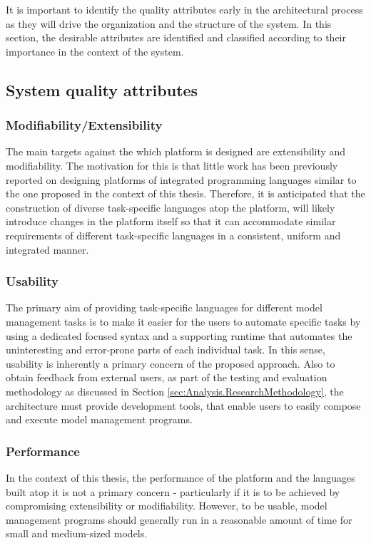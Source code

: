 It is important to identify the quality attributes early in the architectural process as they will drive the organization and the structure of the system. In this section, the desirable attributes are identified and classified according to their importance in the context of the system.

\subsection{System quality attributes}

\subsubsection{Modifiability/Extensibility}
The main targets against the which platform is designed are extensibility and modifiability. The motivation for this is that little work has been previously reported on designing platforms of integrated programming languages similar to the one proposed in the context of this thesis. Therefore, it is anticipated that the construction of diverse task-specific languages atop the platform, will likely introduce changes in the platform itself so that it can accommodate similar requirements of different task-specific languages in a consistent, uniform and integrated manner.

\subsubsection{Usability}
The primary aim of providing task-specific languages for different model management tasks is to make it easier for the users to automate specific tasks by using a dedicated focused syntax and a supporting runtime that automates the uninteresting and error-prone parts of each individual task. In this sense, usability is inherently a primary concern of the proposed approach. Also to obtain feedback from external users, as part of the testing and evaluation methodology as discussed in Section \ref{sec:Analysis.ResearchMethodology}, the architecture must provide development tools, that enable users to easily compose and execute model management programs.

\subsubsection{Performance}
In the context of this thesis, the performance of the platform and the languages built atop it is not a primary concern - particularly if it is to be achieved by compromising extensibility or modifiability. However, to be usable, model management programs should generally run in a reasonable amount of time for small and medium-sized models.

